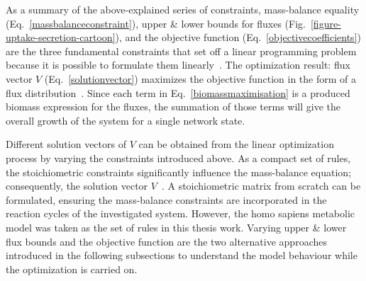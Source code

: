 

As a summary of the above-explained series of constraints, mass-balance equality (Eq.~\eqref{massbalanceconstraint}), upper \& lower bounds for fluxes (Fig.~\ref{figure-uptake-secretion-cartoon}), and the objective function (Eq.~\eqref{objectivecoefficients}) are the three fundamental constraints that set off a linear programming problem because it is possible to formulate them linearly~\cite{PRICE2004}. The optimization result: flux vector $V$ (Eq.~\eqref{solutionvector}) maximizes the objective function in the form of a flux distribution~\cite{KAUFFMAN2003491,PRICE2004}. Since each term in Eq.~\eqref{biomassmaximisation} is a produced biomass expression for the fluxes, the summation of those terms will give the overall growth of the system for a single network state.

Different solution vectors of $V$ can be obtained from the linear optimization process by varying the constraints introduced above. As a compact set of rules, the stoichiometric constraints significantly influence the mass-balance equation; consequently, the solution vector $V$~\cite{Edwards2001}. A stoichiometric matrix from scratch can be formulated, ensuring the mass-balance constraints are incorporated in the reaction cycles of the investigated system. However, the homo sapiens metabolic model was taken as the set of rules in this thesis work. Varying upper \& lower flux bounds and the objective function are the two alternative approaches introduced in the following subsections to understand the model behaviour while the optimization is carried on.

